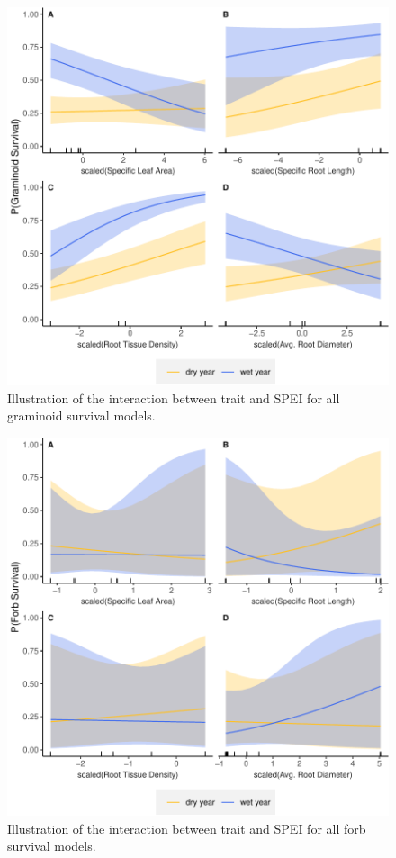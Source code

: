 \documentclass[12pt, letterpaper]{article}
\begin{document}
\begin{figure}
\includegraphics[width=1\textwidth]{figures/supGramSurvPlots-1.pdf}
\caption{\small{
Illustration of the interaction between trait and SPEI for all graminoid survival models.
}}
\label{fig:GramSurv_all}
\end{figure}

\begin{figure}
\includegraphics[width=1\textwidth]{figures/supForbSurvPlots-1.pdf}
\caption{\small{
Illustration of the interaction between trait and SPEI for all forb survival models.
}}
\label{fig:ForbSurv_all}
\end{figure}
\end{document}
